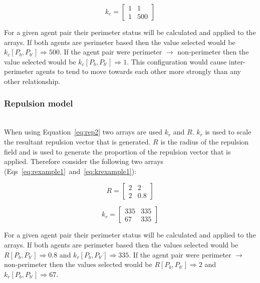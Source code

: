 \documentclass[12pt,a4paper]{IEEEtran}
\newcommand{\kc}{\mathit{k_{c}}}
\newcommand{\kr}{\mathit{k_{r}}}
\newcommand{\rb}{\mathit{R}}
\begin{document}
\begin{equation}\label{eq:kcexample1}
	\kc = 
	\begin{bmatrix}
	1 & 1\\
	1 & 500
	\end{bmatrix}
\end{equation}

For a given agent pair their perimeter status will be calculated and applied to the arrays. If both agents are perimeter based then the value selected would be $k_c[P_b,P_{b'}]\Rightarrow 500$. If the agent pair were perimeter $\rightarrow$ non-perimeter then the value selected would be $k_c[P_b,P_{b'}]\Rightarrow 1$. This configuration would cause inter-perimeter agents to tend to move towards each other more strongly than any other relationship.

\subsubsection{Repulsion model}~\\
When using Equation~\ref{eq:rep2} two arrays are used $\kr$ and $\rb$. $\kr$ is used to scale the resultant repulsion vector that is generated. $\rb$ is the radius of the repulsion field and is used to generate the proportion of the repulsion vector that is applied. Therefore consider the following two arrays (Eqs~\ref{eq:rexample1}~and~\ref{eq:krexample1}):

\begin{equation}\label{eq:rexample1}
	\rb = 
	\begin{bmatrix}
	2 & 2\\
	2 & 0.8
	\end{bmatrix}
\end{equation}

\begin{equation}\label{eq:krexample1}
	\kr = 
	\begin{bmatrix}
	335 & 335\\
	67 & 335
	\end{bmatrix}
\end{equation}

For a given agent pair their perimeter status will be calculated and applied to the arrays. If both agents are perimeter based then the values selected would be $\rb[P_b,P_{b'}]\Rightarrow 0.8$ and $\kr[P_b,P_{b'}]\Rightarrow 335$. If the agent pair were perimeter $\rightarrow$ non-perimeter then the values selected would be $\rb[P_b,P_{b'}]\Rightarrow 2$ and $\kr[P_b,P_{b'}]\Rightarrow 67$.\\
\end{document}
